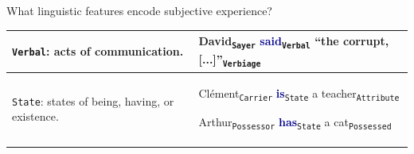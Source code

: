 \documentclass[handout,10pt]{beamer}
\begin{document}
\begin{frame}{What linguistic features encode subjective experience?}
\begin{table}[!htb]
{\begin{tabular}{p{4.7cm}|p{7.3cm}}
    \texttt{Verbal}: acts of communication. &
    \textcolor{blueNCS}{David}\textsubscript{\texttt{Sayer}} \textcolor{DarkBlue}{\textbf{said}}\textsubscript{\texttt{Verbal}} \textcolor{blueNCS}{``the corrupt, [...]''}\textsubscript{\texttt{Verbiage}} \\ \hline

    \texttt{State}: states of being, having, or existence. &
    
    \textcolor{blueNCS}{Clément}\textsubscript{\texttt{Carrier}} \textcolor{DarkBlue}{\textbf{is}}\textsubscript{\texttt{State}} \textcolor{blueNCS}{a teacher}\textsubscript{\texttt{Attribute}} \newline
    
    \textcolor{blueNCS}{Arthur}\textsubscript{\texttt{Possessor}} \textcolor{DarkBlue}{\textbf{has}}\textsubscript{\texttt{State}} \textcolor{blueNCS}{a cat}\textsubscript{\texttt{Possessed}} \\ %
  \end{tabular}}
  \label{tab:process_participants}
\end{table}

    

\end{frame}
\end{document}
